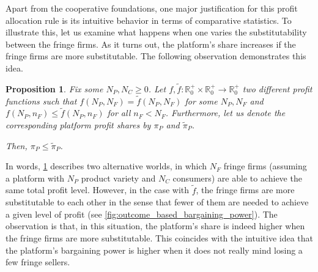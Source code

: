 \documentclass[a4paper]{article}
\newtheorem{proposition}{Proposition}
\begin{document}
Apart from the cooperative foundations, one major justification for this profit allocation rule is its intuitive behavior in terms of comparative statistics.
To illustrate this, let us examine what happens when one varies the substitutability between the fringe firms.
As it turns out, the platform's share increases if the fringe firms are more substitutable.
The following observation demonstrates this idea.
\begin{proposition}
    \label{prop:outcome_based_bargaining_power}
    Fix some $N_P, N_C \geq 0$. Let $f, \tilde{f}: \mathbb{R}^+_0 \times \mathbb{R}^+_0 \to \mathbb{R}^+_0$ two different profit functions such that $f(N_P, N_F) = \tilde{f}(N_P, N_F)$ for some $N_P, N_F$ and $f(N_P, n_F) \leq \tilde{f}(N_P, n_F)$ for all $n_F < N_F$.
    Furthermore, let us denote the corresponding platform profit shares by $\pi_P$ and $\tilde{\pi}_P$.
    
    Then, $\pi_P \leq \tilde{\pi}_P$.
\end{proposition}

In words, \cref{prop:outcome_based_bargaining_power} describes two alternative worlds, in which $N_F$ fringe firms (assuming a platform with $N_P$ product variety and $N_C$ consumers) are able to achieve the same total profit level.
However, in the case with $\tilde{f}$, the fringe firms are more substitutable to each other in the sense that fewer of them are needed to achieve a given level of profit (see \cref{fig:outcome_based_bargaining_power}).
The observation is that, in this situation, the platform's share is indeed higher when the fringe firms are more substitutable.
This coincides with the intuitive idea that the platform's bargaining power is higher when it does not really mind losing a few fringe sellers.
\end{document}
